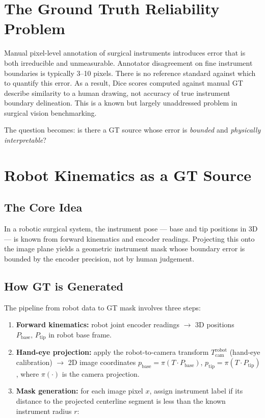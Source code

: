 \documentclass[11pt, a4paper]{article}
\begin{document}
\section{The Ground Truth Reliability Problem}

Manual pixel-level annotation of surgical instruments introduces error that
is both irreducible and unmeasurable. Annotator disagreement on fine instrument
boundaries is typically 3--10 pixels. There is no reference standard against
which to quantify this error. As a result, Dice scores computed against manual
GT describe similarity to a human drawing, not accuracy of true instrument
boundary delineation. This is a known but largely unaddressed problem in
surgical vision benchmarking.

The question becomes: is there a GT source whose error is \textit{bounded}
and \textit{physically interpretable}?

\section{Robot Kinematics as a GT Source}

\subsection{The Core Idea}

In a robotic surgical system, the instrument pose --- base and tip positions
in 3D --- is known from forward kinematics and encoder readings.
Projecting this onto the image plane yields a geometric instrument mask
whose boundary error is bounded by the encoder precision, not by human
judgement.

\subsection{How GT is Generated}

The pipeline from robot data to GT mask involves three steps:

\begin{enumerate}[noitemsep]
    \item \textbf{Forward kinematics:} robot joint encoder readings
          $\to$ 3D positions $P_\text{base},\, P_\text{tip}$ in robot
          base frame.
    \item \textbf{Hand-eye projection:} apply the robot-to-camera
          transform $T_\text{cam}^{\text{robot}}$ (hand-eye calibration)
          $\to$ 2D image coordinates
          $p_\text{base} = \pi(T \cdot P_\text{base})$,\;
          $p_\text{tip}  = \pi(T \cdot P_\text{tip})$,
          where $\pi(\cdot)$ is the camera projection.
    \item \textbf{Mask generation:} for each image pixel $x$, assign
          instrument label if its distance to the projected centerline
          segment is less than the known instrument radius $r$:
\end{enumerate}
\end{document}
